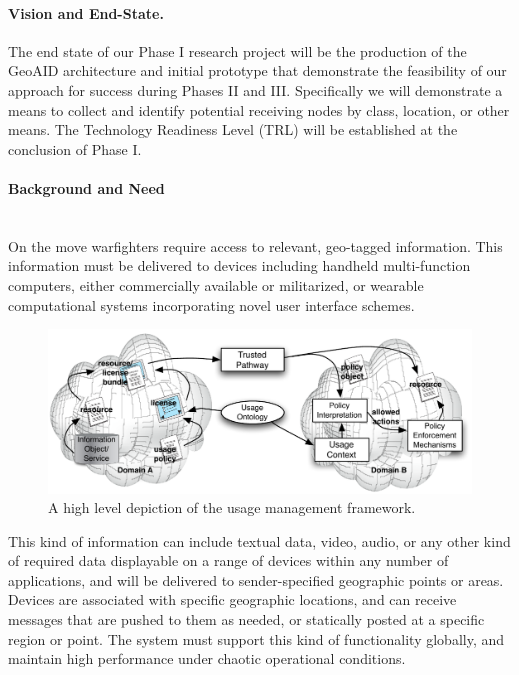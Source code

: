 \documentclass{sbir}
\begin{document}
\paragraph{Vision and End-State.} The end state of our Phase I research project will be the production of the GeoAID architecture and initial prototype that demonstrate the feasibility of our approach for success during Phases II and III. Specifically we will demonstrate a means to collect and identify potential receiving nodes by class, location, or other means. The Technology Readiness Level (TRL) will be established at the conclusion of Phase I.

\paragraph{Background and Need}~\\
On the move warfighters require access to relevant, geo-tagged information. This information must be delivered to devices including handheld multi-function computers, either commercially available or militarized, or wearable computational systems incorporating novel user interface schemes.

\begin{figure}
  \centerline{\includegraphics[width=5.5in]{./images/UM-highlevel.pdf}}
  \caption{A high level depiction of the usage management framework.}
  \label{UM-highlevel}
 \end{figure}


This kind of information can include textual data, video, audio, or any other kind of required data displayable on a range of devices within any number of applications, and will be  delivered to sender-specified geographic points or areas. Devices are associated with specific geographic locations, and can receive messages that are pushed to them as needed, or statically posted at a specific region or point. The system must support this kind of functionality globally, and maintain high performance under chaotic operational conditions.
\end{document}
